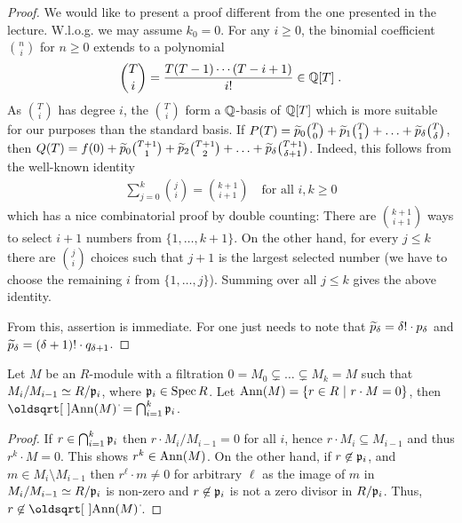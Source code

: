 \documentclass[a4paper,parskip=half,numbers=enddot, DIV=12]{scrreprt}
\begin{document}
\begin{proof}
	We would like to present a proof different from the one presented in the lecture. W.l.o.g. we may assume $k_0=0$. For any $i\geq0$, the binomial coefficient $\binom{n}{i}$ for $n\geq0$ extends to a polynomial 
	\begin{align*}
		\binom{T}{i}=\frac{T(T-1)\cdots(T-i+1)}{i!}\in\mathbb{Q}[T]\;.
	\end{align*}
	As $\binom{T}{i}$ has degree $i$, the $\binom{T}{i}$ form a $\mathbb{Q}$-basis of $\mathbb{Q}[T]$ which is more suitable for our purposes than the standard basis. If $P(T)=\snake p_0\binom{T}{0}+\snake p_1\binom{T}{1}+\ldots+\snake p_\delta \binom{T}{\delta}$, then $Q(T)=f(0)+\snake p_0\binom{T+1}{1}+\snake p_2\binom{T+1}{2}+\ldots+\snake p_\delta\binom{T+1}{\delta+1}$. Indeed, this follows from the well-known identity
	\begin{align*}
		\sum_{j=0}^{k}\binom{j}{i}=\binom{k+1}{i+1}\quad\text{for all }i,k\geq 0
	\end{align*}
	which has a nice combinatorial proof by double counting: There are $\binom{k+1}{i+1}$ ways to select $i+1$ numbers from $\{1,\ldots,k+1\}$. On the other hand, for every $j\leq k$ there are $\binom{j}{i}$ choices such that $j+1$ is the largest selected number (we have to choose the remaining $i$ from $\{1,\ldots,j\}$). Summing over all $j\leq k$ gives the above identity.
	
	From this, assertion  is immediate. For  one just needs to note that $\snake p_\delta=\delta!\cdot p_\delta$ and $\snake p_\delta=(\delta+1)!\cdot q_{\delta+1}$.
\end{proof}
\begin{fact}
    Let $M$ be an $R$-module with a filtration $0=M_0\subsetneq \ldots \subsetneq M_k=M$ such that $M_i/M_{i-1}\simeq R/\mathfrak{p}_i$, where $\mathfrak{p}_i \in \operatorname{Spec} R$. Let $\operatorname{Ann}(M) = \left\{r\in R\ \middle|\  r\cdot M = 0\right\}$, then $\sqrt{\Ann(M)} = \bigcap_{i=1}^k\pp_i$.
\end{fact}
\begin{proof}
    If $r\in \bigcap_{i=1}^k\mathfrak{p}_i$ then $r\cdot M_i/M_{i-1} = 0$ for all $i$, hence $r\cdot M_i\subseteq M_{i-1}$ and thus $r^k\cdot M =0$. This shows $r^k\in \operatorname{Ann}(M)$. On the other hand, if $r\not\in \mathfrak{p}_i$, and $m\in M_i\setminus M_{i-1}$ then $r^\ell\cdot m \neq 0$ for arbitrary $\ell$ as the image of $m$ in $M_i/M_{i-1} \simeq R/\mathfrak{p}_i$ is non-zero and $r\not\in \mathfrak{p}_i$ is not a zero divisor in $R/\mathfrak{p}_i$. Thus, $r\not\in \sqrt{\Ann(M)}$.
\end{proof}
\end{document}
